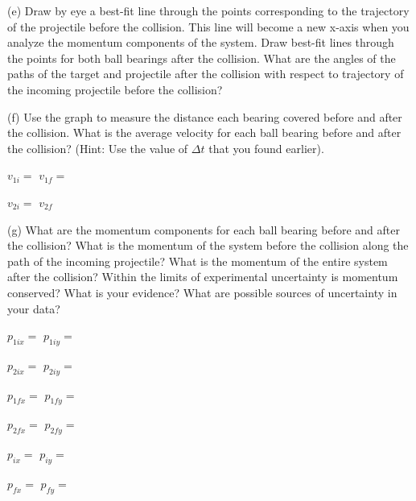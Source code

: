 (e) Draw by eye a best-fit line through the points corresponding to the trajectory
of the projectile before the collision. This line will become a new x-axis when
you analyze the momentum components of the system. Draw best-fit lines through
the points for both ball bearings after the collision. What are the angles of
the paths of the target and projectile after the collision with respect to trajectory
of the incoming projectile before the collision? 
\vspace{10mm}

(f) Use the graph to measure the distance each bearing covered before and after
the collision. What is the average velocity for each ball bearing before and
after the collision? (Hint: Use the value of \( \Delta  t\) that you found
earlier).
\vspace{5mm}

\( v_{1i}= \) \hfill{}\( v_{1f}= \)  \hfill{}
\vspace{5mm}

\( v_{2i} =\)  \hfill{}\( v_{2f} \)  \hfill{}
\vspace{5mm}

(g) What are the momentum components for each ball bearing before and after
the collision? What is the momentum of the system before the collision along
the path of the incoming projectile? What is the momentum of the entire system
after the collision? Within the limits of experimental uncertainty is momentum
conserved? What is your evidence? What are possible sources of uncertainty in
your data?
\vspace{5mm}

\( p_{1ix}= \)  \hfill{}\( p_{1iy} =\)  \hfill{}
\vspace{5mm}

\( p_{2ix} =\)  \hfill{}\( p_{2iy}= \) \hfill{} 
\vspace{5mm}

\( p_{1fx} =\)  \hfill{}\( p_{1fy}= \) \hfill{} 
\vspace{5mm}

\( p_{2fx}= \) \hfill{}\( p_{2fy} =\)  \hfill{}
\vspace{5mm}

\( p_{ix} =\)  \hfill{}\( p_{iy}= \) \hfill{} 
\vspace{5mm}

\( p_{fx} =\)  \hfill{}\( p_{fy}= \) \hfill{} 
\vspace{5mm}

